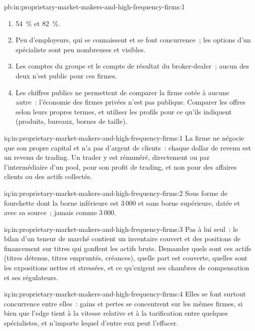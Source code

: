 \begin{solution}{pb:in:proprietary-market-makers-and-high-frequency-firms:1}
\begin{enumerate}
\item 54~\% et 82~\%.
\item Peu d'employeurs, qui se connaissent et se font concurrence~; les options d'un spécialiste sont peu nombreuses et visibles.
\item Les comptes du groupe et le compte de résultat du broker-dealer~; aucun des deux n'est public pour ces firmes.
\item Les chiffres publics ne permettent de comparer la firme cotée à aucune autre~: l'économie des firmes privées n'est pas publique. Comparer les
offres selon leurs propres termes, et utiliser les profils pour ce qu'ils indiquent (produits, bureaux, bornes de taille).
\end{enumerate}
\end{solution}

\begin{solution}{iq:in:proprietary-market-makers-and-high-frequency-firms:1}
La firme ne négocie que son propre capital et n'a pas d'argent de clients~: chaque dollar de revenu est un revenu de trading. Un trader y
est rémunéré, directement ou par l'intermédiaire d'un pool, pour son profit de trading, et non pour des affaires clients ou des actifs collectés.
\end{solution}

\begin{solution}{iq:in:proprietary-market-makers-and-high-frequency-firms:2}
Sous forme de fourchette dont la borne inférieure est 3\,000 et sans borne supérieure, datée et avec sa source~; jamais comme 3\,000.
\end{solution}

\begin{solution}{iq:in:proprietary-market-makers-and-high-frequency-firms:3}
Pas à lui seul~: le bilan d'un teneur de marché contient un inventaire couvert et des positions de financement sur titres qui gonflent
les actifs bruts. Demander quels sont ces actifs (titres détenus, titres empruntés, créances), quelle part est couverte,
quelles sont les expositions nettes et stressées, et ce qu'exigent ses chambres de compensation et ses régulateurs.
\end{solution}

\begin{solution}{iq:in:proprietary-market-makers-and-high-frequency-firms:4}
Elles se font surtout concurrence entre elles~: gains et pertes se concentrent sur les mêmes firmes, si bien que l'edge tient
à la vitesse relative et à la tarification entre quelques spécialistes, et n'importe lequel d'entre eux peut l'effacer.
\end{solution}

